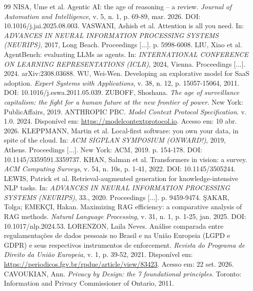 \documentclass[12pt,openright,twoside,a4paper,english,brazil]{abntex2}
\begin{document}
\postextual
\begin{thebibliography}{99}
 NISA, Ume et al. Agentic AI: the age of reasoning -- a review. \textit{Journal of Automation and Intelligence}, v. 5, n. 1, p. 69-89, mar. 2026. DOI: 10.1016/j.jai.2025.08.003.
 VASWANI, Ashish et al. Attention is all you need. In: \textit{ADVANCES IN NEURAL INFORMATION PROCESSING SYSTEMS (NEURIPS)}, 2017, Long Beach. Proceedings [...]. p. 5998-6008.
 LIU, Xiao et al. AgentBench: evaluating LLMs as agents. In: \textit{INTERNATIONAL CONFERENCE ON LEARNING REPRESENTATIONS (ICLR)}, 2024, Vienna. Proceedings [...]. 2024. arXiv:2308.03688.
 WU, Wei-Wen. Developing an explorative model for SaaS adoption. \textit{Expert Systems with Applications}, v. 38, n. 12, p. 15057-15064, 2011. DOI: 10.1016/j.eswa.2011.05.039.
 ZUBOFF, Shoshana. \textit{The age of surveillance capitalism: the fight for a human future at the new frontier of power}. New York: PublicAffairs, 2019.
 ANTHROPIC PBC. \textit{Model Context Protocol Specification}. v. 1.0. 2024. Disponível em: \url{https://modelcontextprotocol.io}. Acesso em: 10 abr. 2026.
 KLEPPMANN, Martin et al. Local-first software: you own your data, in spite of the cloud. In: \textit{ACM SIGPLAN SYMPOSIUM (ONWARD!)}, 2019, Athens. Proceedings [...]. New York: ACM, 2019. p. 154-178. DOI: 10.1145/3359591.3359737.
 KHAN, Salman et al. Transformers in vision: a survey. \textit{ACM Computing Surveys}, v. 54, n. 10s, p. 1-41, 2022. DOI: 10.1145/3505244.
 LEWIS, Patrick et al. Retrieval-augmented generation for knowledge-intensive NLP tasks. In: \textit{ADVANCES IN NEURAL INFORMATION PROCESSING SYSTEMS (NEURIPS)}, 33., 2020. Proceedings [...]. p. 9459-9474.
 ŞAKAR, Tolga; EMEKÇI, Hakan. Maximizing RAG efficiency: a comparative analysis of RAG methods. \textit{Natural Language Processing}, v. 31, n. 1, p. 1-25, jan. 2025. DOI: 10.1017/nlp.2024.53.
 LORENZON, Laila Neves. Análise comparada entre regulamentações de dados pessoais no Brasil e na União Europeia (LGPD e GDPR) e seus respectivos instrumentos de enforcement. \textit{Revista do Programa de Direito da União Europeia}, v. 1, p. 39-52, 2021. Disponível em: \url{https://periodicos.fgv.br/rpdue/article/view/83423}. Acesso em: 22 set. 2026.
 CAVOUKIAN, Ann. \textit{Privacy by Design: the 7 foundational principles}. Toronto: Information and Privacy Commissioner of Ontario, 2011.

\end{thebibliography}
\end{document}
